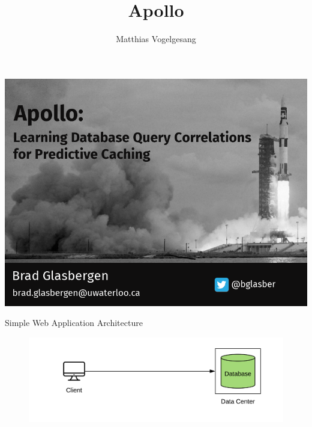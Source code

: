 \documentclass[12pt]{beamer}
\title{Apollo}
\date{}
\author{Matthias Vogelgesang}
\institute{Center for modern beamer themes}
\begin{document}
\begin{frame}{}
\vspace*{-0.2cm}
\hspace*{-1.07cm}
\includegraphics[keepaspectratio=true,width=1.03\paperwidth]{title_slide}
\end{frame}

\begin{frame}{Simple Web Application Architecture}
    \begin{figure}
        \center
        \hspace*{-1cm}
        \includegraphics[scale=0.2]{apollo_intro_arch}
    \end{figure}
\end{frame}
\end{document}

